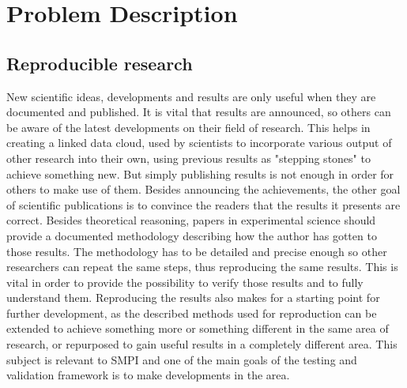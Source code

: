 
\chapter{Problem Description}
\label{Chapter3}

\section{Reproducible research}
New scientific ideas, developments and results are only useful when
they are documented and published. It is vital that results are
announced, so others can be aware of the latest developments on their
field of research. This helps in creating a linked data cloud, used by
scientists to incorporate various output of other research into their
own, using previous results as "stepping stones" to achieve something
new.\cite{babbccrddg10} But simply publishing results is not enough in
order for others to make use of them. Besides announcing the
achievements, the other goal of scientific publications is to convince
the readers that the results it presents are correct. Besides
theoretical reasoning, papers in experimental science should provide a
documented methodology describing how the author has gotten to those
results.\cite{m10} The methodology has to be detailed and precise
enough so other researchers can repeat the same steps, thus
reproducing the same results. This is vital in order to provide the
possibility to verify those results and to fully understand
them. Reproducing the results also makes for a starting point for
further development, as the described methods used for reproduction
can be extended to achieve something more or something different in
the same area of research, or repurposed to gain useful results in a
completely different area. This subject is relevant to SMPI and one of
the main goals of the testing and validation framework is to make
developments in the area.
